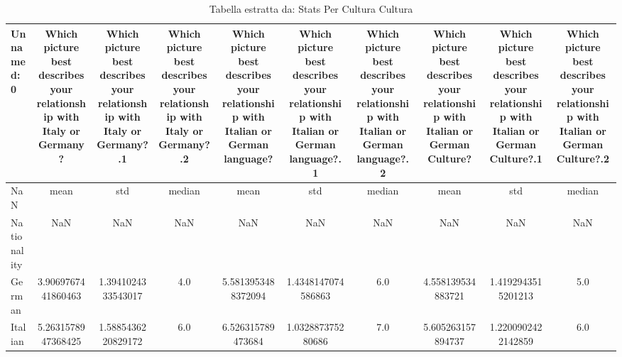\begin{table}[htbp]
\caption{Tabella estratta da: Stats Per Cultura Cultura}
\label{tab:stats_per_cultura_cultura}
\begin{tabular}{lccccccccc}
\toprule
Unnamed: 0 & Which picture best describes your relationship with Italy or Germany? & Which picture best describes your relationship with Italy or Germany?.1 & Which picture best describes your relationship with Italy or Germany?.2 & Which picture best describes your relationship with Italian or German language? & Which picture best describes your relationship with Italian or German language?.1 & Which picture best describes your relationship with Italian or German language?.2 & Which picture best describes your relationship with Italian or German Culture? & Which picture best describes your relationship with Italian or German Culture?.1 & Which picture best describes your relationship with Italian or German Culture?.2 \\
\midrule
NaN & mean & std & median & mean & std & median & mean & std & median \\
Nationality & NaN & NaN & NaN & NaN & NaN & NaN & NaN & NaN & NaN \\
German & 3.9069767441860463 & 1.3941024333543017 & 4.0 & 5.5813953488372094 & 1.4348147074586863 & 6.0 & 4.558139534883721 & 1.4192943515201213 & 5.0 \\
Italian & 5.2631578947368425 & 1.5885436220829172 & 6.0 & 6.526315789473684 & 1.032887375280686 & 7.0 & 5.605263157894737 & 1.2200902422142859 & 6.0 \\
\bottomrule
\end{tabular}
\end{table}
